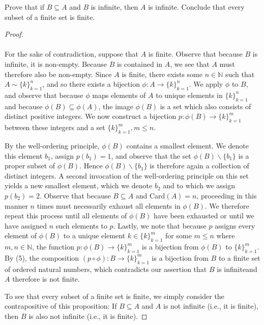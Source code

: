 Prove that if $B\subseteq A$ and $B$ is infinite, then $A$ is infinite. 
Conclude that every subset of a finite set is finite.

\begin{proof}\ \\\\
    For the sake of contradiction, suppose that $A$ is finite. Observe that
    because $B$ is infinite, it is non-empty. Because $B$ is contained in $A$,
    we see that $A$ must therefore also be non-empty. Since $A$ is finite, there
    exists some $n \in \mathbb{N}$ such that $A \sim \{k\}_{k=1}^n$, and so
    there exists a bijection $\phi:A \to \{k\}_{k=1}^n$. We apply $\phi$
    to $B$, and observe that because $\phi$ maps elements of $A$ to unique elements in 
    $\{k\}_{k=1}^n$ and because $\phi(B) \subseteq \phi(A)$, the image $\phi(B)$ is a set which
    also consists of distinct positive integers. We now construct a bijection $p:\phi(B) \to \{k\}_{k=1}^m$
     between these integers and a set $\{k\}_{k=1}^m, m \le n$.
    
    By the well-ordering principle, $\phi(B)$ contains a smallest element.
    We denote this element $b_1$, assign $p(b_1) = 1$, and observe that the set 
    $\phi(B) \backslash \{b_1\}$ is a proper subset of $\phi(B)$. Hence $\phi(B) \backslash \{b_1\}$
    is therefore again a collection of distinct integers. A second invocation of the well-ordering
    principle on this set yields a new smallest element, which we denote $b_2$ and to which we assign 
    $p(b_2) = 2$.  Observe that because $B \subseteq A$ and Card$(A) = n$, proceeding in this 
    manner $n$ times must necessarily exhaust all elements in $\phi(B)$.  We therefore repeat this 
    process until all elements of $\phi(B)$ have been exhausted or until we have assigned $n$ such 
    elements to $p$. Lastly, we note that because $p$ assigns every element of $\phi(B)$ to a unique
    element $k \in \{k\}_{k=1}^m$ for some $m \le n$ where $m,n \in \mathbb{N}$, the function
    $p:\phi(B) \to \{k\}_{k=1}^m$ is a bijection from $\phi(B)$ to $\{k\}_{k=1}^m$. By (5), the
    composition $(p \circ \phi):B \to \{k\}_{k=1}^m$ is a bijection from $B$ to a finite
    set of ordered natural numbers, which contradicts our assertion that $B$ is 
    infinite\footnotemark and $A$ therefore is not finite.

    To see that every subset of a finite set is finite, we simply consider the
    contrapositive of this proposition: If $B \subseteq A$ and $A$ is not
    infinite (i.e., it is finite), then $B$ is also not infinite (i.e., it is
    finite).
    
\end{proof}